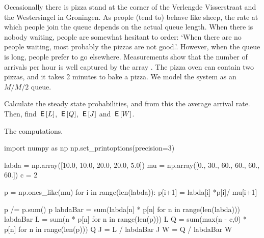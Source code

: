 \documentclass[queueing-book.tex]{subfiles}
\begin{document}
\begin{exercise}\label{ex:39}
Occasionally there is pizza stand at the corner of the Verlengde Visserstraat and the Westersingel in Groningen.
As people (tend to) behave like sheep, the rate at which people join the queue depends on the actual queue length. When there is nobody waiting, people are somewhat hesitant to order: `When there are no people waiting, most probably the pizzas are not good.'. However, when the queue is long, people prefer to go elsewhere.
Measurements show that the number of arrivals per hour is well captured by the array
.
The pizza oven can contain two pizzas, and it takes 2 minutes to bake a pizza. We model the system as an $M/M/2$ queue.

Calculate the steady state probabilities, and from this  the average arrival rate. Then, find $\,\mathsf{E}\left[L\right]$, $\,\mathsf{E}\left[Q\right]$, $\,\mathsf{E}\left[J\right]$ and $\,\mathsf{E}\left[W\right]$.
\begin{solution}
The computations.
\begin{pyconsole}[pizza]
import numpy as np
np.set_printoptions(precision=3)

labda = np.array([10.0, 10.0, 20.0, 20.0, 5.0])
mu = np.array([0., 30., 60., 60., 60., 60.])
c = 2

p = np.ones_like(mu)
for i in range(len(labda)):
    p[i+1] = labda[i] *p[i]/ mu[i+1]

p /= p.sum()
p
labdaBar = sum(labda[n] * p[n] for n in range(len(labda)))
labdaBar
L = sum(n * p[n] for n in range(len(p)))
L
Q = sum(max(n - c,0) * p[n] for n in range(len(p)))
Q
J = L / labdaBar
J
W = Q / labdaBar
W
\end{pyconsole}

\end{solution}
\end{exercise}
\end{document}
